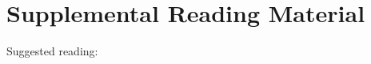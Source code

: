 \section{Supplemental Reading Material}
\par\noindent Suggested reading:
\par%
\cite{tr:Carter_2001}\cite{tr:Martin_Dateunkn}
\cite{tr:ADI_2009}\cite{tr:Zumbahlen_2012}\cite{tr:Kester_2017}
\cite{tr:Renesas_2011}
%
